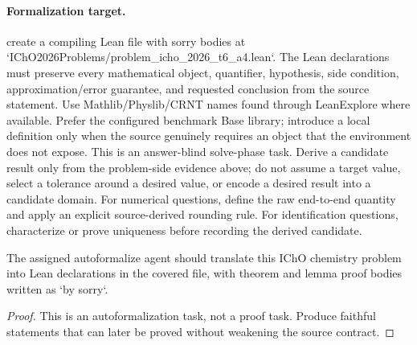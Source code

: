 \paragraph{Formalization target.}
create a compiling Lean file with sorry bodies at `IChO2026Problems/problem\_icho\_2026\_t6\_a4.lean`.
The Lean declarations must preserve every mathematical object, quantifier, hypothesis, side condition, approximation/error guarantee, and requested conclusion from the source statement.
Use Mathlib/Physlib/CRNT names found through LeanExplore where available. Prefer the configured benchmark Base library; introduce a local definition only when the source genuinely requires an object that the environment does not expose.
This is an answer-blind solve-phase task. Derive a candidate result only from the problem-side evidence above; do not assume a target value, select a tolerance around a desired value, or encode a desired result into a candidate domain.
For numerical questions, define the raw end-to-end quantity and apply an explicit source-derived rounding rule. For identification questions, characterize or prove uniqueness before recording the derived candidate.

\begin{theorem}
\label{thm:physics:icho_2026_t6_a4:target}
The assigned autoformalize agent should translate this IChO chemistry problem into Lean declarations in the covered file, with theorem and lemma proof bodies written as `by sorry`.
\end{theorem}
\begin{proof}
This is an autoformalization task, not a proof task. Produce faithful statements that can later be proved without weakening the source contract.
\end{proof}
